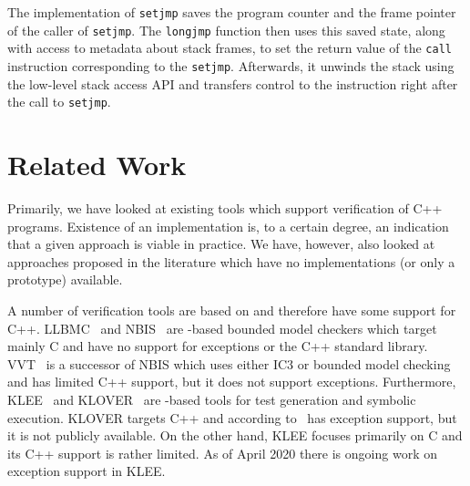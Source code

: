 The \divine{} implementation of \texttt{setjmp} saves the program counter
and the frame pointer of the caller of \texttt{setjmp}.
The \texttt{longjmp} function then uses this saved state, along with access to
metadata about stack frames, to set the return value of the \texttt{call}
instruction corresponding to the \texttt{setjmp}.
Afterwards, it unwinds the stack using the low-level stack access API and
transfers control to the instruction right after the call to \texttt{setjmp}.

\section{Related Work}\label{sec:lang:related}

Primarily, we have looked at existing tools which support verification
of C++ programs. Existence of an implementation is, to a certain degree,
an indication that a given approach is viable in practice. We have,
however, also looked at approaches proposed in the literature which have
no implementations (or only a prototype) available.

A number of verification tools are based on \llvm{} and therefore have some
support for C++. LLBMC~\cite{Falke2013} and
NBIS~\cite{Gunther2014} are \llvm{}-based bounded model
checkers which target mainly C and have no support for exceptions or the
C++ standard library. VVT~\cite{Gunther2016} is a
successor of NBIS which uses either IC3 or bounded model checking and
has limited C++ support, but it does not support exceptions.
Furthermore, KLEE~\cite{Cadar2008} and KLOVER~\cite{Li2011}
are \llvm{}-based tools for test generation and symbolic execution. KLOVER
targets C++ and according to~\cite{Li2011} has exception support,
but it is not publicly available. On the other hand, KLEE focuses
primarily on C and its C++ support is rather limited.
As of April 2020 there is ongoing work on exception support in KLEE.


